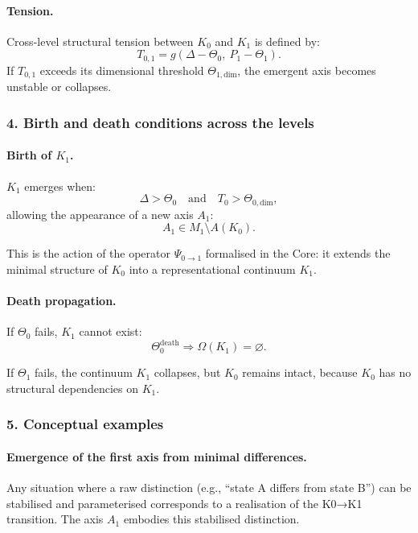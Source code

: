 \paragraph{Tension.}
Cross-level structural tension between $K_0$ and $K_1$ is defined by:
\[
T_{0,1} = g(\Delta - \Theta_0,\ P_1 - \Theta_1).
\]
If $T_{0,1}$ exceeds its dimensional threshold $\Theta_{1,\mathrm{dim}}$,
the emergent axis becomes unstable or collapses.

\subsubsection{4. Birth and death conditions across the levels}

\paragraph{Birth of \texorpdfstring{$K_1$}{K_1}.}
$K_1$ emerges when:
\[
\Delta > \Theta_0
\quad \text{and} \quad
T_0 > \Theta_{0,\mathrm{dim}},
\]
allowing the appearance of a new axis $A_1$:
\[
A_1 \in M_1 \setminus A(K_0).
\]

This is the action of the operator $\Psi_{0\rightarrow 1}$ formalised in the
Core: it extends the minimal structure of $K_0$ into a representational
continuum $K_1$.

\paragraph{Death propagation.}
If $\Theta_0$ fails, $K_1$ cannot exist:
\[
\Theta_0^{\mathrm{death}}
\Rightarrow \Omega(K_1)=\varnothing.
\]

If $\Theta_1$ fails, the continuum $K_1$ collapses, but $K_0$ remains intact,
because $K_0$ has no structural dependencies on $K_1$.

\subsubsection{5. Conceptual examples}

\paragraph{Emergence of the first axis from minimal differences.}
Any situation where a raw distinction (e.g., ``state A differs from state B'')
can be stabilised and parameterised corresponds to a realisation of the
K0→K1 transition. The axis $A_1$ embodies this stabilised distinction.


